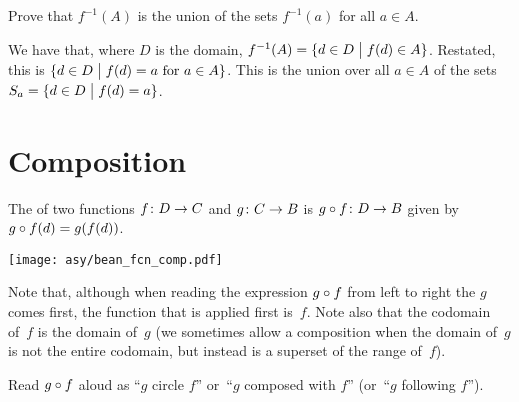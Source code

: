 \documentclass{ibl}  %
\begin{document}
\begin{ex}
Prove that $f^{-1}(A)$ is the union of the sets $f^{-1}(a)$ for all $a\in A$.
\begin{ans}
We have that, where $D$ is the domain, 
$f^{-1}(A)=\{d\in D \bigm| f(d)\in A\}$.
Restated, this is $\{d\in D \bigm| \text{$f(d)=a$ for $a\in A$}\}$.
This is the union over all $a\in A$ of the 
sets $S_a=\{d\in D \bigm| f(d)=a\}$.  
\end{ans}
\end{ex}





\section{Composition}

\begin{df}
The  of
two functions
$\mbox{$f\colon D\to C$}$ and $\mbox{$g\colon C\to B$}$ 
is $\mbox{$g\mathbin{\circ} f\colon D\to B$}$ given by 
$g\mathbin{\circ} f(d)=g(f(d))$.
\end{df}

\begin{center}
  \texttt{[image: asy/bean\_fcn\_comp.pdf]}  
\end{center}

Note that, 
although when reading the expression $g\mathbin{\circ} f$ from left to right 
the $g$ comes first, 
the function that is applied first is~$f$. 
Note also that the codomain of~$f$ is the domain of~$g$
(we sometimes allow a composition when the domain of~$g$ is not the 
entire codomain, but instead is a superset of the range of~$f$).

Read $g\mathbin{\circ} f$ aloud as ``$g$ circle $f$'' 
or~``$g$ composed with $f$''
(or~``$g$ following $f$'').
\end{document}
